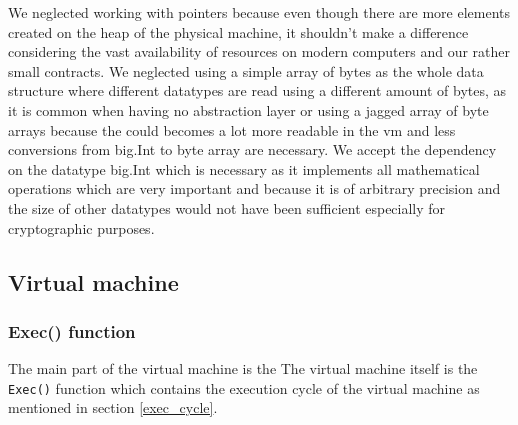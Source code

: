 We neglected working with pointers because even though there are more elements created on the heap of the physical machine, it shouldn't make a difference considering the vast availability of resources on modern computers and our rather small contracts. We neglected using a simple array of bytes as the whole data structure where different datatypes are read using a different amount of bytes, as it is common when having no abstraction layer or using a jagged array of byte arrays because the could becomes a lot more readable in the vm and less conversions from big.Int to byte array are necessary. We accept the dependency on the datatype big.Int which is necessary as it implements all mathematical operations which are very important and because it is of arbitrary precision and the size of other datatypes would not have been sufficient especially for cryptographic purposes.

\subsection{Virtual machine}

\subsubsection{Exec() function}
The main part of the virtual machine is the The virtual machine itself is the \texttt{Exec()} function which contains the execution cycle of the virtual machine as mentioned in section \ref{exec_cycle}. 



